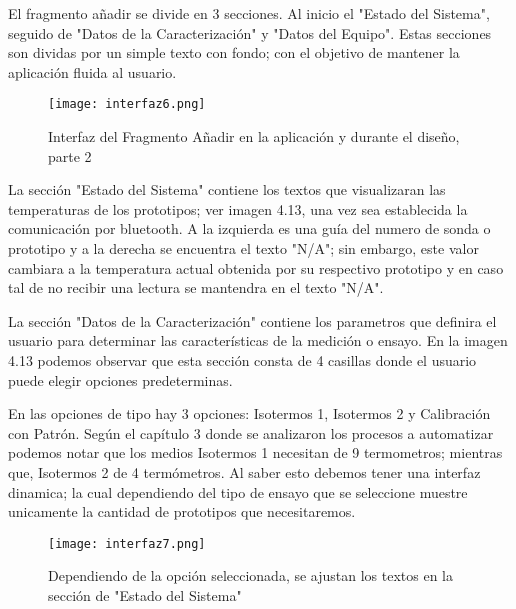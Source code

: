 \par \noindent
El fragmento añadir se divide en 3 secciones. Al inicio el "Estado del Sistema", seguido de  "Datos de la Caracterización" y "Datos del Equipo". Estas secciones son dividas por un simple texto con fondo; con el objetivo de mantener la aplicación fluida al usuario.

\begin{figure}[H]
	\centering
	\texttt{[image: interfaz6.png]}
	\caption{Interfaz del Fragmento Añadir en la aplicación y durante el diseño, parte 2}
\end{figure}

\par \noindent
La sección "Estado del Sistema" contiene los textos que visualizaran las temperaturas de los prototipos; ver imagen 4.13, una vez sea establecida la comunicación por bluetooth. A la izquierda es una guía del numero de sonda o prototipo y a la derecha se encuentra el texto "N/A"; sin embargo, este valor cambiara a la temperatura actual obtenida por su respectivo prototipo y en caso tal de no recibir una lectura se mantendra en el texto "N/A".

\par \noindent
La sección "Datos de la Caracterización" contiene los parametros que definira el usuario para determinar las características de la medición o ensayo. En la imagen 4.13 podemos observar que esta sección consta de 4 casillas donde el usuario puede elegir opciones predeterminas.

\par \noindent
En las opciones de tipo hay 3 opciones: Isotermos 1, Isotermos 2 y Calibración con Patrón. Según el capítulo 3 donde se analizaron los procesos a automatizar podemos notar que los medios Isotermos 1 necesitan de 9 termometros; mientras que, Isotermos 2 de 4 termómetros. Al saber esto debemos tener una interfaz dinamica; la cual dependiendo del tipo de ensayo que se seleccione muestre unicamente la cantidad de prototipos que necesitaremos. 

\begin{figure}[H]
	\centering
	\texttt{[image: interfaz7.png]}
	\caption{Dependiendo de la opción seleccionada, se ajustan los textos en la sección de "Estado del Sistema"}
\end{figure}

